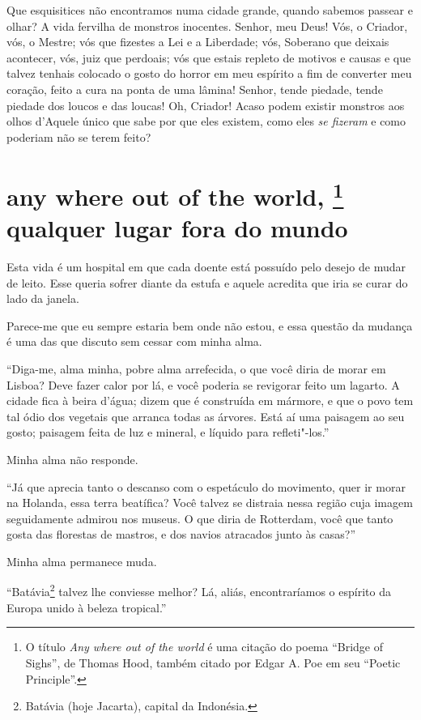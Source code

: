 Que esquisitices não encontramos numa cidade grande, quando sabemos
passear e olhar? A vida fervilha de monstros inocentes. Senhor, meu
Deus! Vós, o Criador, vós, o Mestre; vós que fizestes a Lei e a
Liberdade; vós, Soberano que deixais acontecer, vós, juiz que perdoais;
vós que estais repleto de motivos e causas e que talvez tenhais
colocado o gosto do horror em meu espírito a fim de converter meu
coração, feito a cura na ponta de uma lâmina! Senhor, tende piedade,
tende piedade dos loucos e das loucas! Oh, Criador! Acaso podem existir
monstros aos olhos d’Aquele único que sabe por
que eles existem, como eles \textit{se fizeram} e como poderiam não se
terem feito?

\quebra\section[Any where out of the world, qualquer lugar fora do mundo]{any where out of the world,%
\protect\footnote{ O título \textit{Any where 
out of the world} é uma citação do poema
``Bridge of Sighs'', de Thomas Hood, também citado por Edgar A. Poe em seu ``Poetic Principle''.} 
qualquer lugar fora do mundo}

Esta vida é um hospital em que cada doente está possuído pelo desejo de
mudar de leito. Esse queria sofrer diante da estufa e aquele
acredita que iria se curar do lado da janela.

Parece-me que eu sempre estaria bem onde não estou, e essa questão
da mudança é uma das que discuto sem cessar com minha alma.

“Diga-me, alma minha, pobre alma arrefecida, o que você
diria de morar em Lisboa? Deve fazer calor por lá, e você poderia se revigorar
feito um lagarto. A cidade fica à beira d’água; dizem que é
construída em mármore, e que o povo tem tal ódio dos vegetais que
arranca todas as árvores. Está aí uma paisagem ao seu gosto;
paisagem feita de luz e mineral, e líquido para refleti"-los.''

Minha alma não responde.

“Já que aprecia tanto o descanso com o espetáculo do
movimento, quer ir morar na Holanda, essa terra beatífica? Você
talvez se distraia nessa região cuja imagem seguidamente admirou nos
museus. O que diria de Rotterdam, você que tanto gosta das florestas de
mastros, e dos navios atracados junto às casas?''

Minha alma permanece muda.

“Batávia\footnote{ Batávia (hoje Jacarta), capital da Indonésia.}
 talvez lhe conviesse melhor?
Lá, aliás, encontraríamos o espírito da Europa unido à beleza
tropical.''

